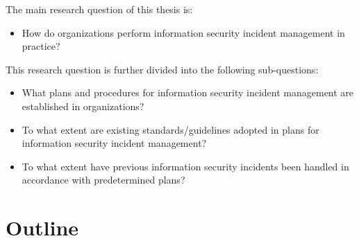 The main research question of this thesis is:
\begin{itemize}
\item How do organizations perform information security incident management in practice?
\end{itemize}

This research question is further divided into the following sub-questions:

\begin{itemize}\itemsep-0.1cm
\item What plans and procedures for information security incident management are established in organizations?
\item To what extent are existing standards/guidelines adopted in plans for information security incident management?
\item To what extent have previous information security incidents been handled in accordance with predetermined plans? 
\end{itemize}

\section{Outline}